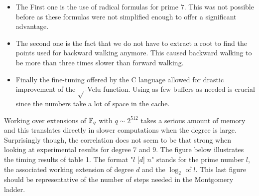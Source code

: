 \documentclass[../main.tex]{subfiles}
\begin{document}
\begin{itemize}
	\item The First one is the use of radical formulas for prime $7$.
	This was not possible before as these formulas were not simplified enough to offer a significant advantage.
	\item The second one is the fact that we do not have to extract a root to find the points used for backward walking anymore.
	This caused backward walking to be more than three times slower than forward walking.
	\item Finally the fine-tuning offered by the C language allowed for drastic improvement of the $\sqrt{}$-Velu function.
	Using as few buffers as needed is crucial since the numbers take a lot of space in the cache.
\end{itemize}
Working over extensions of $\mathbb{F}_q$ with $q\sim 2^{512}$ takes a serious amount of memory and this translates directly in slower computations when the degree is large.
Surprisingly though, the correlation does not seem to be that strong when looking at experimental results for degree $7$ and $9$.
The figure below illustrates the timing results of table 1.
The format "$l$ [$d$] $n$" stands for the prime number $l$, the associated working extension of degree $d$ and the $\log_2$ of $l$.
This last figure should be representative of the number of steps needed in the Montgomery ladder.
\end{document}
